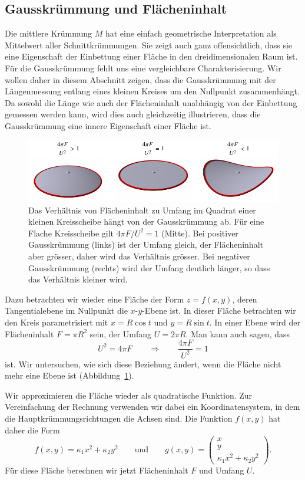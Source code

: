 \subsection{Gausskrümmung und Flächeninhalt%
\label{skript:kurven:gaussflaeche}}
Die mittlere Krümmung $M$ hat eine einfach geometrische Interpretation
als Mittelwert aller Schnittkrümmungen.
Sie zeigt auch ganz offensichtlich, dass sie eine Eigenschaft der Einbettung
einer Fläche in den dreidimensionalen Raum ist.
Für die Gausskrümmung fehlt uns eine vergleichbare Charakterisierung.
Wir wollen daher in diesem Abschnitt zeigen, dass die Gausskrümmung
mit der Längenmessung entlang eines kleinen Kreises um den Nullpunkt
zusammenhängt.
Da sowohl die Länge wie auch der Flächeninhalt unabhängig von der
Einbettung gemessen werden kann,
wird dies auch gleichzeitig illustrieren, dass die Gausskrümmung eine
innere Eigenschaft einer Fläche ist.

\begin{figure}
\centering
\includegraphics{chapters/tikz/4pifu2.pdf}
\caption{Das Verhältnis von Flächeninhalt zu Umfang im Quadrat einer
kleinen Kreisscheibe hängt von der Gausskrümmung ab. 
Für eine Flache Kreisscheibe gilt $4\pi F/U^2=1$ (Mitte).
Bei positiver Gausskrümmung (links) ist der Umfang gleich, der Flächeninhalt
aber grösser, daher wird das Verhältnis grösser.
Bei negativer Gausskrümmung (rechts) wird der Umfang deutlich länger, so dass
das Verhältnis kleiner wird.
\label{skript:kurven:4pifu2vis}}
\end{figure}
Dazu betrachten wir wieder eine Fläche der Form $z=f(x,y)$, deren
Tangentialebene im Nullpunkt die $x$-$y$-Ebene ist.
In dieser Fläche betrachten wir den Kreis parametrisiert mit
$x=R\cos t$ und $y=R\sin t$.
In einer Ebene wird der Flächeninhalt $F=\pi R^2$ sein, der Umfang $U=2\pi R$.
Man kann auch sagen, dass
\[
U^2 = 4\pi F
\qquad\Rightarrow\qquad
\frac{4\pi F}{U^2}=1
\]
ist.
Wir untersuchen, wie sich diese Beziehung ändert, wenn die
Fläche nicht mehr eine Ebene ist (Abbildung~\ref{skript:kurven:4pifu2vis}).

Wir approximieren die Fläche wieder als quadratische Funktion.
Zur Vereinfachung der Rechnung verwenden wir dabei ein Koordinatensystem,
in dem die Hauptkrümmungsrichtungen die Achsen sind.
Die Funktion $f(x,y)$ hat daher die Form
\[
f(x,y)
=
\kappa_1 x^2 + \kappa_2 y^2
\qquad\text{und}\qquad
g(x,y)=\begin{pmatrix}x\\y\\\kappa_1x^2 + \kappa_2y^2\end{pmatrix}.
\]
Für diese Fläche berechnen wir jetzt Flächeninhalt $F$ und 
Umfang $U$.

